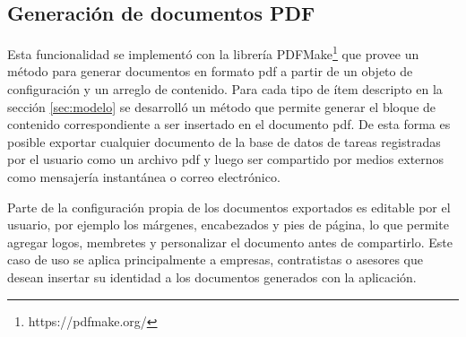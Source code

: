 \subsection{Generación de documentos PDF}
Esta funcionalidad se implementó con la librería PDFMake\footnote{https://pdfmake.org/} que provee un método para generar documentos en formato pdf a partir de un objeto de configuración y un arreglo de contenido. Para cada tipo de ítem descripto en la sección \ref{sec:modelo} se desarrolló un método que permite generar el bloque de contenido correspondiente a ser insertado en el documento pdf. De esta forma es posible exportar cualquier documento de la base de datos de tareas registradas por el usuario como un archivo pdf y luego ser compartido por medios externos como mensajería instantánea o correo electrónico.

Parte de la configuración propia de los documentos exportados es editable por el usuario, por ejemplo los márgenes, encabezados y pies de página, lo que permite agregar logos, membretes y personalizar el documento antes de compartirlo. Este caso de uso se aplica principalmente a empresas, contratistas o asesores que desean insertar su identidad a los documentos generados con la aplicación.
